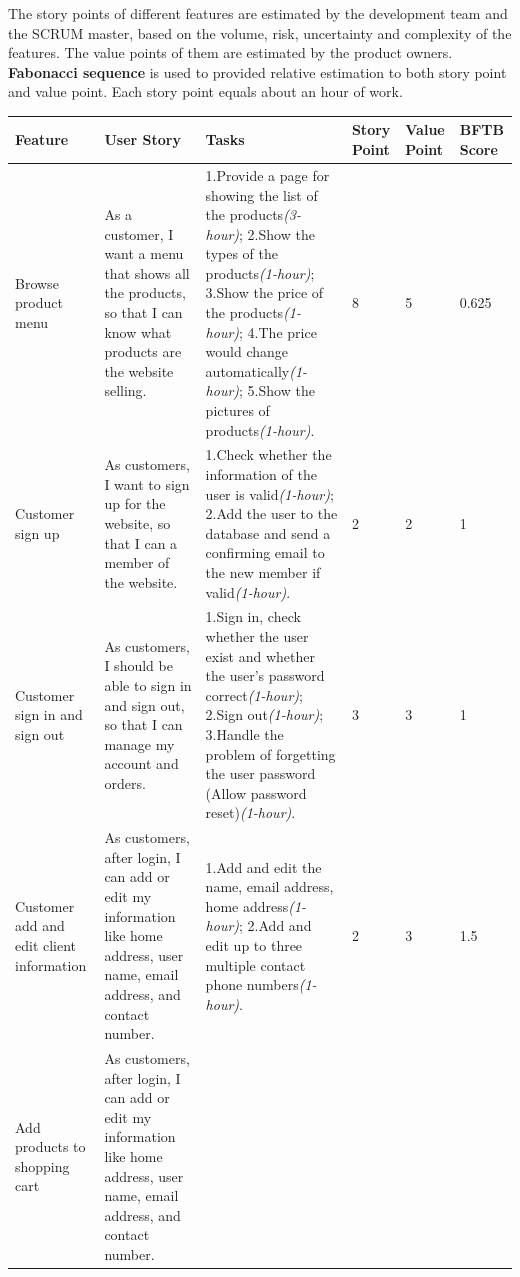 \documentclass{report}
\begin{document}
The story points of different features are estimated by the development team and the SCRUM master, based on the volume, risk, uncertainty and complexity of the features. The value points of them are estimated by the product owners. \textbf{Fabonacci sequence} is used to provided relative estimation to both story point and value point. Each story point equals about an hour of work.
\\
\begin{tabularx}{\linewidth}{%
  >{\raggedright\arraybackslash}p{1.5cm}%
  >{\raggedright\arraybackslash}X%
  >{\raggedright\arraybackslash}X%
  p{1cm}p{1cm}p{1cm}
  }
  \toprule
  Feature & User Story & Tasks & Story Point & Value Point & BFTB Score\\
  \midrule
  Browse product menu 
  & As a customer, I want a menu that shows all the products, so that I can know what products are the website selling. 
  & 1.Provide a page for showing the list of the products\textit{(3-hour)}; 2.Show the types of the products\textit{(1-hour)}; 3.Show the price of the products\textit{(1-hour)}; 4.The price would change automatically\textit{(1-hour)}; 5.Show the pictures of products\textit{(1-hour)}.
  & 8
  & 5
  & 0.625\\
  \midrule
  Customer sign up
  & As customers, I want to sign up for the website, so that I can a member of the website.
  & 1.Check whether the information of the user is valid\textit{(1-hour)}; 2.Add the user to the database and send a confirming email to the new member if valid\textit{(1-hour)}.
  & 2
  & 2
  & 1
  \\
  \midrule
  Customer sign in and sign out
  & As customers, I should be able to sign in and sign out, so that I can manage my account and orders.
  & 1.Sign in, check whether the user exist and whether the user's password correct\textit{(1-hour)}; 2.Sign out\textit{(1-hour)}; 3.Handle the problem of forgetting the user password (Allow password reset)\textit{(1-hour)}.
  & 3
  & 3
  & 1
  \\
  \midrule
  Customer add and edit client information
  & As customers, after login, I can add or edit my information like home address, user name, email address, and contact number.
  & 1.Add and edit the name, email address, home address\textit{(1-hour)}; 2.Add and edit up to three multiple contact phone numbers\textit{(1-hour)}.
  & 2
  & 3
  & 1.5
  \\
  \midrule
  Add products to shopping cart
  & As customers, after login, I can add or edit my information like home address, user name, email address, and contact number.

\end{tabularx}
\end{document}
